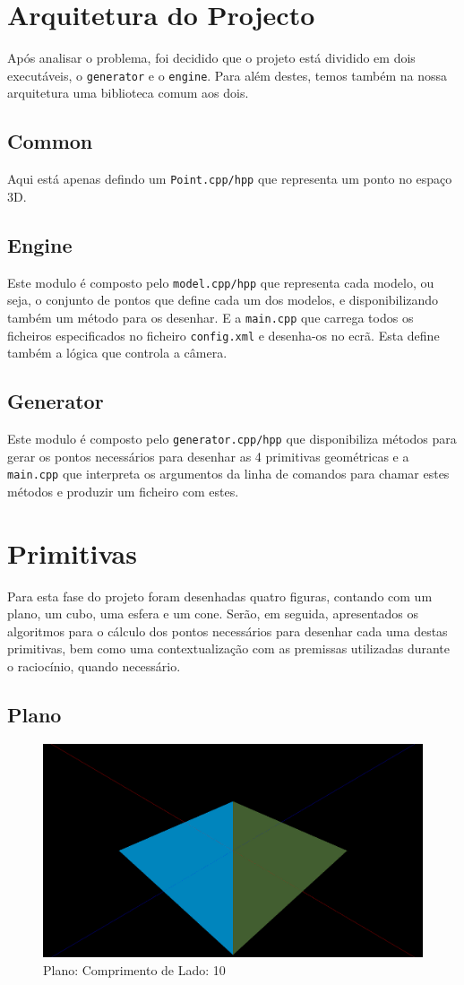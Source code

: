\documentclass[a4paper]{article}
\begin{document}
\section{Arquitetura do Projecto}
Após analisar o problema, foi decidido que o projeto está dividido em dois executáveis, o \texttt{generator} e o \texttt{engine}. Para além destes, temos também na nossa arquitetura uma biblioteca comum aos dois.

\subsection{Common}

Aqui está apenas defindo um \texttt{Point.cpp/hpp} que representa um ponto no espaço 3D.

\subsection{Engine}

Este modulo é composto pelo \texttt{model.cpp/hpp} que representa cada modelo, ou seja, o conjunto de pontos que define cada um dos modelos, e disponibilizando também um método para os desenhar. E a \texttt{main.cpp} que carrega todos os ficheiros especificados no ficheiro \texttt{config.xml} e desenha-os no ecrã. Esta define também a lógica que controla a câmera.

\subsection{Generator}

Este modulo é composto pelo \texttt{generator.cpp/hpp} que disponibiliza métodos para gerar os pontos necessários para desenhar as 4 primitivas geométricas e a \texttt{main.cpp} que interpreta os argumentos da linha de comandos para chamar estes métodos e produzir um ficheiro com estes.

\section{Primitivas}
Para esta fase do projeto foram desenhadas quatro figuras, contando com um plano, um cubo, uma esfera e um cone. Serão, em seguida, apresentados os algoritmos para o cálculo dos pontos necessários para desenhar cada uma destas primitivas, bem como uma contextualização com as premissas utilizadas durante o raciocínio, quando necessário.
\subsection{Plano}
\begin{figure}[H]
    \centering
    \includegraphics[width=0.5\linewidth]{plane.png}
    \caption{Plano: Comprimento de Lado: 10}
\end{figure}
\end{document}
